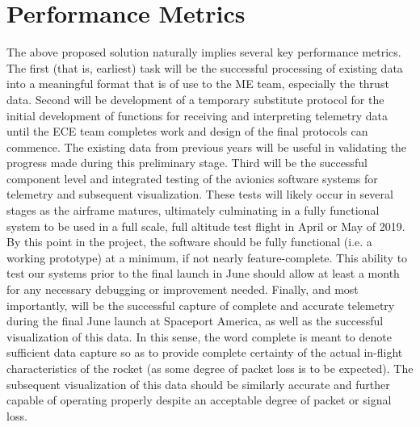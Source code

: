 \documentclass[onecolumn, draftclsnofoot,10pt, compsoc]{IEEEtran}
\begin{document}
\section{Performance Metrics}

The above proposed solution naturally implies several key performance metrics.
The first (that is, earliest) task will be the successful processing of existing data into a meaningful format that is of use to the ME team, especially the thrust data.
Second will be development of a temporary substitute protocol for the initial development of functions for receiving and interpreting telemetry data until the ECE team completes work and design of the final protocols can commence.
The existing data from previous years will be useful in validating the progress made during this preliminary stage.
Third will be the successful component level and integrated testing of the avionics software systems for telemetry and subsequent visualization. 
These tests will likely occur in several stages as the airframe matures, ultimately culminating in a fully functional system to be used in a full scale, full altitude test flight in April or May of 2019.
By this point in the project, the software should be fully functional (i.e. a working prototype) at a minimum, if not nearly feature-complete.
This ability to test our systems prior to the final launch in June should allow at least a month for any necessary debugging or improvement needed.
Finally, and most importantly, will be the successful capture of complete and accurate telemetry during the final June launch at Spaceport America, as well as the successful visualization of this data.
In this sense, the word complete is meant to denote sufficient data capture so as to provide complete certainty of the actual in-flight characteristics of the rocket (as some degree of packet loss is to be expected).
The subsequent visualization of this data should be similarly accurate and further capable of operating properly despite an acceptable degree of packet or signal loss.
\end{document}
